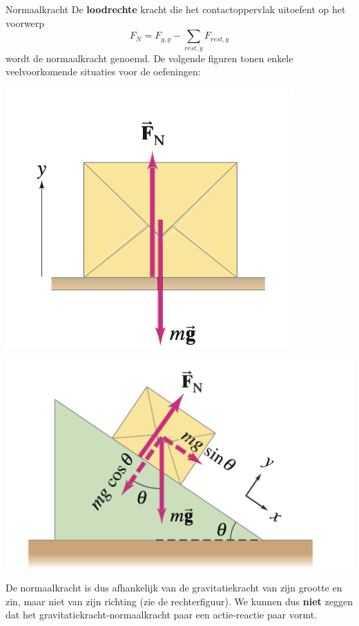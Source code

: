 \begin{theo}[Normaalkracht]{Normaalkracht}
    De \textbf{loodrechte} kracht die het contactoppervlak uitoefent op het voorwerp 
    \begin{equation*}
        F_N = F_{g,y} - \sum_{rest,y} F_{rest,y}
    \end{equation*}
    \noindent wordt de normaalkracht genoemd. De volgende figuren tonen enkele veelvoorkomende situaties voor de oefeningen:
    
    \begin{minipage}{.48\textwidth}
    
        \centering
        \includegraphics[scale = 0.7]{Images/Dynamica/Doos in rust.png}   
    
    \end{minipage} 
    \begin{minipage}{.48\textwidth}
    
        \centering
        \includegraphics[scale = 0.35]{Images/Dynamica/Glijdende doos.png}
        
    \end{minipage}
    
    \vspace{0.25cm}
    
    \noindent De normaalkracht is dus afhankelijk van de gravitatiekracht van zijn grootte en zin, maar niet van zijn richting (zie de rechterfiguur). We kunnen dus \textbf{niet} zeggen dat het gravitatiekracht-normaalkracht paar een actie-reactie paar vormt. 
\end{theo}


